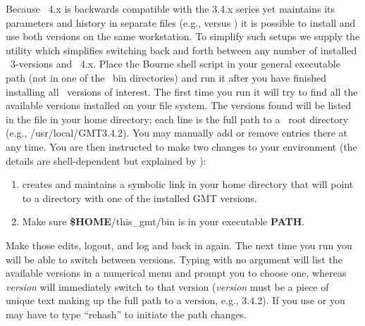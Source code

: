 Because \GMT\ 4.x is backwards compatible with the 3.4.x series yet maintains its parameters
and history in separate files (e.g.,  versus )
it is possible to install and use both versions on the same workstation.  To simplify such
setups we supply the utility  which simplifies switching back and forth
between any number of installed \GMT\ 3-versions and \GMT\ 4.x.  Place the  Bourne
shell script in your
general executable path (not in one of the \GMT\ bin directories) and run it after you have
finished installing all \GMT\ versions of interest.  The first time you run 
it will try to find all the available versions installed on your file system.  The versions
found will be listed in the file  in your home directory; each line
is the full path to a \GMT\ root directory (e.g., /usr/local/GMT3.4.2).  You may
manually add or remove entries there at any time.  You are then instructed to make two
changes to your environment (the details are shell-dependent but explained by ):
\begin{enumerate}
\item {} creates and maintains a symbolic link  in your home
directory that will point to a directory with one of the installed GMT versions.
\item Make sure \textbf{\$HOME}/this\_gmt/bin is in your executable \textbf{PATH}.
\end{enumerate}
Make those edits, logout, and log and back in again.  The next time you run 
you will be able to switch between versions.  Typing  with no argument will list the
available versions in a numerical menu and prompt you to choose one, whereas  \emph{version}
will immediately switch to that version (\emph{version} must be a piece of unique text making
up the full path to a version, e.g., 3.4.2).  If you use  or  you may have to type
``rehash'' to initiate the path changes.

